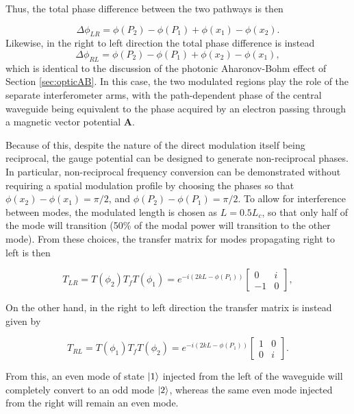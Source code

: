 Thus, the total phase difference between the two pathways is then 

\begin{equation}
\Delta \phi_{LR} = \phi(P_2) - \phi(P_1) + \phi(x_1) - \phi(x_2).
\end{equation}
Likewise, in the right to left direction the total phase difference is instead
\begin{equation}
\Delta \phi_{RL} =  \phi(P_2) - \phi(P_1) + \phi(x_2) - \phi(x_1),
\end{equation}
which is identical to the discussion of the photonic Aharonov-Bohm effect of Section \ref{sec:opticAB}. In this case, the two modulated regions play the role of the separate interferometer arms, with the path-dependent phase of the central waveguide being equivalent to the phase acquired by an electron passing through a magnetic vector potential $\bm{A}$. 

Because of this, despite the nature of the direct modulation itself being reciprocal, the gauge potential can be designed to generate non-reciprocal phases. In particular, non-reciprocal frequency conversion can be demonstrated without requiring a spatial modulation profile by choosing the phases so that $\phi(x_2)-\phi(x_1) = \pi/2$, and $\phi(P_2) - \phi(P_1) = \pi/2$. To allow for interference between modes, the modulated length is chosen as $L = 0.5 L_c$, so that only half of the mode will transition (50\% of the modal power will transition to the other mode). From these choices, the transfer matrix for modes propagating right to left is then

\begin{equation}
T_{LR} = T(\phi_2) T_f T(\phi_1) = e^{-i(2kL - \phi(P_1))} 
\begin{bmatrix}
0 & i \\
-1 & 0
\end{bmatrix},
\end{equation}

On the other hand, in the right to left direction the transfer matrix is instead given by

\begin{equation}
T_{RL} = T(\phi_1)T_f T(\phi_2) =  e^{-i(2kL - \phi(P_1))}
\begin{bmatrix}
1 & 0 \\
0 & i
\end{bmatrix}.
\end{equation}

From this, an even mode of state $\ket{1}$ injected from the left of the waveguide will completely convert to an odd mode $\ket{2}$, whereas the same even mode injected from the right will remain an even mode.

